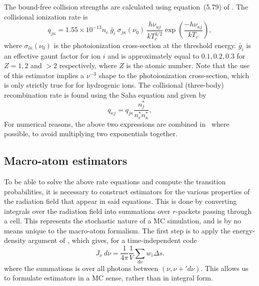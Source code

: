 The bound-free collision strengths are calculated using equation~(5.79) of
\cite{mihalas}. The collisional ionization rate is
\begin{equation}
q_{j\kappa} = 1.55 \times 10^{-13} n_e~\bar{g}_{i}~\sigma_{j\kappa} (\nu_0)~
\frac{h \nu_{uj}}{k T_e^{3/2}}
\exp \left( \frac{- h \nu_{\kappa j}}{k T_e} \right),
\label{eq:vanregemorterw}
\end{equation}
where $\sigma_{l\kappa} (\nu_0)$ is the photoionization cross-section 
at the threshold energy.
$\bar{g}_{i}$ is an effective gaunt factor for ion $i$ and is approximately
equal to $0.1,0.2,0.3$ for $Z=1,2$ and $>2$ respectively,
where $Z$ is the atomic number. Note that the use of this estimator
implies a $\nu^{-3}$ shape to the photoionization cross-section,
which is only strictly true for for hydrogenic ions.
The collisional (three-body) recombination rate is found using the Saha equation
and given by
\begin{equation}
q_{\kappa j} = q_{j\kappa} \frac{n_j^*}{n_e^* n_\kappa^*},
\label{eq:vanregemorterw}
\end{equation}
For numerical reasons, the above two expressions are combined in \py\ where 
possible, to avoid multiplying two exponentials together.





\subsection{Macro-atom estimators}
\label{sec:estimators}
To be able to solve the above rate equations and compute the transition 
probabilities, it is necessary to construct estimators for the various properties
of the radiation field that appear in said equations. This is done
by converting integrals over the radiation field into summations over 
$r$-packets passing through a cell. This represents the stochastic nature of
a MC simulation, and is by no means unique to the macro-atom formalism.
The first step is to apply the energy-density argument of \citep{lucy1999radeq},
which gives, for a time-independent code
\begin{equation}
J_\nu~d\nu = \frac{1}{4\pi}\frac{1}{V} \sum_{d\nu} w_i \Delta s.
\end{equation}
where the summations is over all photons between $(\nu, \nu+'d\nu)$. This allows
us to formulate estimators in a MC sense, rather than in integral form. 

